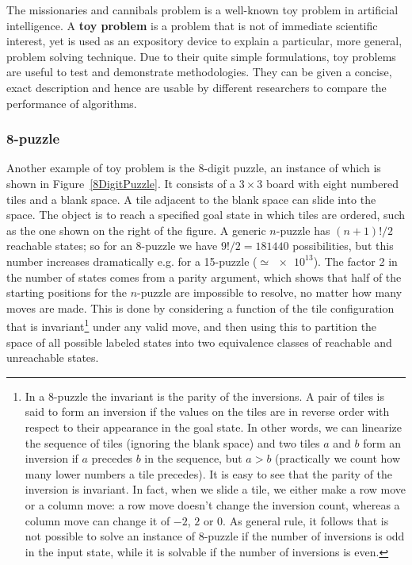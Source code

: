 The missionaries and cannibals problem is a well-known toy problem in artificial intelligence. A \textbf{toy problem} is a problem that is not of immediate scientific interest, yet is used as an expository device to explain a particular, more general, problem solving technique. Due to their quite simple formulations, toy problems are useful to test and demonstrate methodologies. They can be given a concise, exact description and hence are usable by different researchers to compare the performance of algorithms.
\subsubsection{8-puzzle}
Another example of toy problem is the 8-digit puzzle, an instance of which is shown in Figure~\ref{8DigitPuzzle}. It consists of a $3\times3$ board with eight numbered tiles and a blank space. A tile adjacent to the blank space can slide into the space. The object is to reach a specified goal state in which tiles are ordered, such as the one shown on the right of the figure. A generic $n$-puzzle has $(n+1)!/2$ reachable states; so for an 8-puzzle we have $9!/2=181440$ possibilities, but this number increases dramatically e.g. for a 15-puzzle ($\simeq\num{e13}$).
The factor 2 in the number of states comes from a parity argument, which shows that half of the starting positions for the $n$-puzzle are impossible to resolve, no matter how many moves are made. This is done by considering a function of the tile configuration that is invariant\footnote{In a 8-puzzle the invariant is the parity of the inversions. A pair of tiles is said to form an inversion if the values on the tiles are in reverse order with respect to their appearance in the goal state. In other words, we can linearize the sequence of tiles (ignoring the blank space) and two tiles $a$ and $b$ form an inversion if $a$ precedes $b$ in the sequence, but $a>b$ (practically we count how many lower numbers a tile precedes). It is easy to see that the parity of the inversion is invariant. In fact, when we slide a tile, we either make a row move or a column move: a row move doesn't change the inversion count, whereas a column move can change it of $-2$, $2$ or $0$. As general rule, it follows that is not possible to solve an instance of 8-puzzle if the number of inversions is odd in the input state, while it is solvable if the number of inversions is even.} under any valid move, and then using this to partition the space of all possible labeled states into two equivalence classes of reachable and unreachable states.
